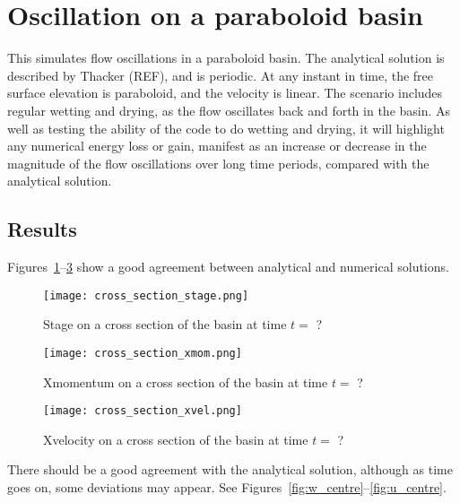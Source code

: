 \section{Oscillation on a paraboloid basin}
This simulates flow oscillations in a paraboloid basin. The analytical solution is described by Thacker (REF), and is periodic. At any instant in time, the free surface elevation is paraboloid, and the velocity is linear. The scenario includes regular wetting and drying, as the flow oscillates back and forth in the basin. As well as testing the ability of the code to do wetting and drying, it will highlight any numerical energy loss or gain, manifest as an increase or decrease in the magnitude of the flow oscillations over long time periods, compared with the analytical solution. 

\subsection{Results}

Figures~\ref{fig:cs_stage}--\ref{fig:cs_xvel} show a good agreement between analytical and numerical solutions.

\begin{figure}[h]
\begin{center}
\texttt{[image: cross\_section\_stage.png]}
\caption{Stage on a cross section of the basin at time $t=$ ?}
\label{fig:cs_stage}
\end{center}
\end{figure}

\begin{figure}[h]
\begin{center}
\texttt{[image: cross\_section\_xmom.png]}
\caption{Xmomentum on a cross section of the basin at time $t=$ ?}
\label{fig:cs_xmom}
\end{center}
\end{figure}

\begin{figure}[h]
\begin{center}
\texttt{[image: cross\_section\_xvel.png]}
\caption{Xvelocity on a cross section of the basin at time $t=$ ?}
\label{fig:cs_xvel}
\end{center}
\end{figure}


There should be a good agreement with the analytical solution, although as time goes on, some deviations may appear.  See Figures~\ref{fig:w_centre}--\ref{fig:u_centre}.

